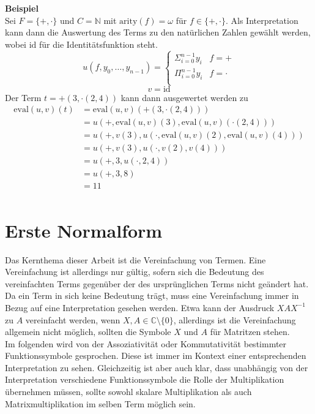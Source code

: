 \documentclass{article}
\begin{document}
\textbf{Beispiel}\\
Sei $F = \{+, \cdot \}$ und $C = \mathbb{N}$ mit $\mathrm{arity}(f) = \omega$ für $f\in \{+, \cdot \}$.
Als Interpretation kann dann die Auswertung des Terms zu den natürlichen Zahlen gewählt werden, wobei $\mathrm{id}$ für die Identitätsfunktion steht.
$$u(f, y_0, \dots, y_{n-1}) = \begin{cases}
\Sigma_{i = 0}^{n-1} y_i & f = +\\
\Pi_{i = 0}^{n-1} y_i & f = \cdot\\
\end{cases}$$
$$v = \mathrm{id}$$
Der Term $t = +(3, \cdot(2, 4))$ kann dann ausgewertet werden zu 
\begin{equation*}
    \begin{split}
    \mathrm{eval}(u, v)(t) &= \mathrm{eval}(u, v)(+(3, \cdot(2, 4))) \\
    &= u(+, \mathrm{eval}(u, v)(3), \mathrm{eval}(u, v)(\cdot(2, 4))) \\
    &= u(+, v(3), u(\cdot, \mathrm{eval}(u, v)(2), \mathrm{eval}(u, v)(4))) \\
    &= u(+, v(3), u(\cdot, v(2), v(4))) \\
    &= u(+, 3, u(\cdot, 2, 4)) \\
    &= u(+, 3, 8) \\
    &= 11 \\
    \end{split}
\end{equation*}

\section {Erste Normalform}

Das Kernthema dieser Arbeit ist die Vereinfachung von Termen. Eine Vereinfachung ist allerdings nur gültig, sofern sich die Bedeutung des vereinfachten Terms gegenüber der des ursprünglichen Terms nicht geändert hat. Da ein Term in sich keine Bedeutung trägt, muss eine Vereinfachung immer in Bezug auf eine Interpretation gesehen werden. Etwa kann der Ausdruck $X A X^{-1}$ zu $A$ vereinfacht werden, wenn $X, A \in \mathbb{C} \setminus \{0\}$, allerdings ist die Vereinfachung allgemein nicht möglich, sollten die Symbole $X$ und $A$ für Matritzen stehen. \\
Im folgenden wird von der Assoziativität oder Kommutativität bestimmter Funktionssymbole gesprochen. Diese ist immer im Kontext einer entsprechenden Interpretation zu sehen. Gleichzeitig ist aber auch klar, dass unabhängig von der Interpretation verschiedene Funktionssymbole die Rolle der Multiplikation übernehmen müssen, sollte sowohl skalare Multiplikation als auch Matrixmultiplikation im selben Term möglich sein. \\
\end{document}
